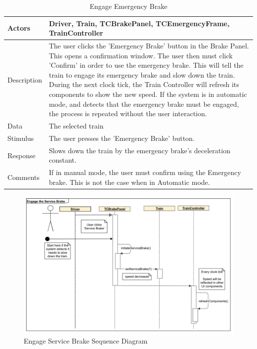 \documentclass[]{article}
\begin{document}
\begin{table}[H]
	\centering
	\caption{Engage Emergency Brake}
	\begin{tabular}{|l|l|}
		\hline
		Actors & \parbox[t]{10cm}{Driver, Train, TCBrakePanel, TCEmergencyFrame, TrainController} \\ \hline
		Description & \parbox[t]{10cm}{The user clicks the 'Emergency Brake' button in the Brake Panel. This opens a confirmation window. The user then must click 'Confirm' in order to use the emergency brake. This will tell the train to engage its emergency brake and slow down the train. During the next clock tick, the Train Controller will refresh its components to show the new speed. If the system is in automatic mode, and detects that the emergency brake must be engaged, the process is repeated without the user interaction. } \\ \hline
		Data &  \parbox[t]{10cm}{The selected train} \\ \hline
		Stimulus &  \parbox[t]{10cm}{ The user presses the 'Emergency Brake' button. } \\ \hline
		Response & \parbox[t]{10cm}{Slows down the train by the emergency brake's deceleration constant. }\\ \hline
		Comments & \parbox[t]{10cm}{If in manual mode, the user must confirm using the Emergency brake. This is not the case when in Automatic mode.}  \\ \hline
	\end{tabular}
\end{table}

\begin{figure}[H]
	\centering
	\includegraphics[width=\textwidth]{tc_serviceBrake_usecase}
	\caption{Engage Service Brake Sequence Diagram}
\end{figure}
\end{document}
